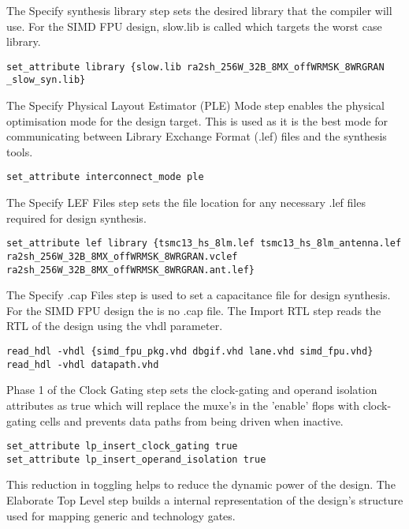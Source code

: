 \documentclass[conference]{IEEEtran}
\begin{document}
The Specify synthesis library step sets the desired library that the compiler will use. For the SIMD FPU design, slow.lib is called which targets the worst case library. 
\begin{framed}
\begin{lstlisting}
set_attribute library {slow.lib ra2sh_256W_32B_8MX_offWRMSK_8WRGRAN _slow_syn.lib}
\end{lstlisting}
\end{framed}
The Specify Physical Layout Estimator (PLE) Mode step enables the physical optimisation mode for the design target. This is used as it is the best mode for communicating between Library Exchange Format (.lef) files and the synthesis tools. 
\begin{framed}
\begin{verbatim}
set_attribute interconnect_mode ple
\end{verbatim}
\end{framed}
The Specify LEF Files step sets the file location for any necessary .lef files required for design synthesis.
\begin{framed}
\begin{lstlisting}
set_attribute lef library {tsmc13_hs_8lm.lef tsmc13_hs_8lm_antenna.lef ra2sh_256W_32B_8MX_offWRMSK_8WRGRAN.vclef ra2sh_256W_32B_8MX_offWRMSK_8WRGRAN.ant.lef}
\end{lstlisting}
\end{framed}
The Specify .cap Files step is used to set a capacitance file for design synthesis. For the SIMD FPU design the is no .cap file. The Import RTL step reads the RTL of the design using the vhdl parameter.
\begin{framed}
\begin{lstlisting}
read_hdl -vhdl {simd_fpu_pkg.vhd dbgif.vhd lane.vhd simd_fpu.vhd}
read_hdl -vhdl datapath.vhd
\end{lstlisting}
\end{framed}
Phase 1 of the Clock Gating step sets the clock-gating and operand isolation attributes as true which will replace the muxe's in the 'enable' flops with clock-gating cells and prevents data paths from being driven when inactive. 
\begin{framed}
\begin{lstlisting}
set_attribute lp_insert_clock_gating true
set_attribute lp_insert_operand_isolation true
\end{lstlisting}
\end{framed}
This reduction in toggling helps to reduce the dynamic power of the design. The Elaborate Top Level step builds a internal representation of the design's structure used for mapping generic and technology gates.
\end{document}
